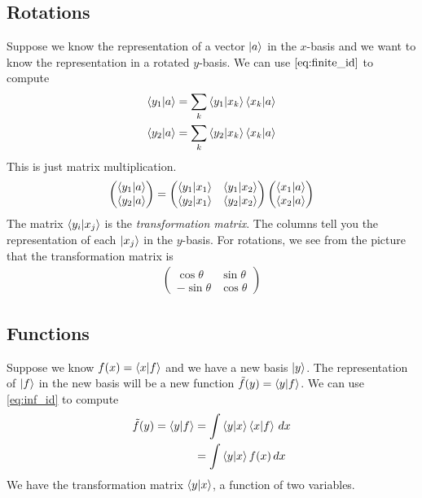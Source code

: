 \documentclass[12pt, oneside, letterpaper, fleqn]{article}
\begin{document}
\subsection{Rotations}
Suppose we know the representation of a vector $\left\lvert a\right\rangle$ in the
$x$-basis and we want to know the representation in a rotated $y$-basis.
We can use $\eqref{eq:finite_id}$ to compute
\begin{align}
\left\langle y_1\middle\vert a\right\rangle &= \sum_k \left\langle y_1\middle\vert x_k\right\rangle\left\langle x_k\middle\vert a\right\rangle\\
\left\langle y_2\middle\vert a\right\rangle &= \sum_k \left\langle y_2\middle\vert x_k\right\rangle\left\langle x_k\middle\vert a\right\rangle
\end{align}
This is just matrix multiplication.
\begin{align*}
\begin{pmatrix}
\left\langle y_1\middle\vert a\right\rangle\\
\left\langle y_2\middle\vert a\right\rangle
\end{pmatrix}
=
\begin{pmatrix}
\left\langle y_1\middle\vert x_1\right\rangle & \left\langle y_1\middle\vert x_2\right\rangle\\
\left\langle y_2\middle\vert x_1\right\rangle & \left\langle y_2\middle\vert x_2\right\rangle\\
\end{pmatrix}
\begin{pmatrix}
\left\langle x_1\middle\vert a\right\rangle\\
\left\langle x_2\middle\vert a\right\rangle
\end{pmatrix}
\end{align*}
The matrix $\left\langle y_i\middle\vert x_j\right\rangle$ is the \emph{transformation matrix}. The
columns tell you the representation of each $\left\lvert x_j\right\rangle$ in the
$y$-basis. For rotations, we see from the picture that the
transformation matrix is
\begin{align*}
\begin{pmatrix}
\cos\theta & \sin\theta\\
-\sin\theta & \cos\theta
\end{pmatrix}
\end{align*}

\subsection{Functions}
Suppose we know $f(x) = \left\langle x\middle\vert f\right\rangle$ and we have a new basis
$\left\lvert y\right\rangle$. The representation of $\left\lvert f\right\rangle$ in the new basis will be a
new function $\tilde{f}(y) = \left\langle y\middle\vert f\right\rangle$. We can use
\eqref{eq:inf_id} to compute
\begin{align}
\tilde{f}(y) = \left\langle y\middle\vert f\right\rangle &= \int
\left\langle y\middle\vert x\right\rangle\left\langle x\middle\vert f\right\rangle\,dx\nonumber\\
&= \int \left\langle y\middle\vert x\right\rangle f(x)\,dx
\end{align}
We have the transformation matrix $\left\langle y\middle\vert x\right\rangle$, a function of two
variables.
\end{document}
